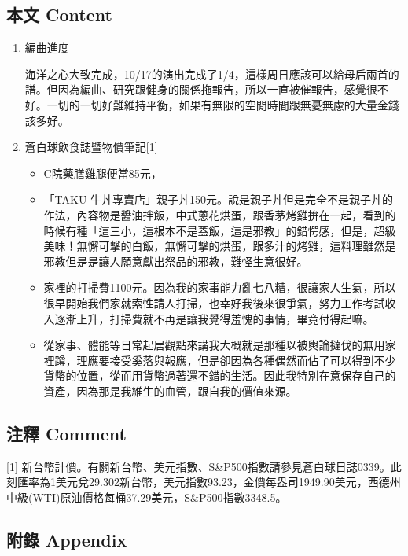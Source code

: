 \documentclass[a5paper, 11pt
]{book}
\providecommand{\tightlist}{%
  \setlength{\itemsep}{0pt}\setlength{\parskip}{0pt}}
\begin{document}
\hypertarget{ux672cux6587-content-10}{%
\subsection{本文 Content}\label{ux672cux6587-content-10}}

\begin{enumerate}
\def\labelenumi{\arabic{enumi}.}
\item
  編曲進度

  海洋之心大致完成，10/17的演出完成了1/4，這樣周日應該可以給母后兩首的譜。但因為編曲、研究跟健身的關係拖報告，所以一直被催報告，感覺很不好。一切的一切好難維持平衡，如果有無限的空閒時間跟無憂無慮的大量金錢該多好。
\item
  蒼白球飲食誌暨物價筆記{[}1{]}

  \begin{itemize}
  \tightlist
  \item
    C院藥膳雞腿便當85元，
  \item
    「TAKU
    牛丼專賣店」親子丼150元。說是親子丼但是完全不是親子丼的作法，內容物是醬油拌飯，中式蔥花烘蛋，跟香茅烤雞拚在一起，看到的時候有種「這三小，這根本不是蓋飯，這是邪教」的錯愕感，但是，超級美味！無懈可擊的白飯，無懈可擊的烘蛋，跟多汁的烤雞，這料理雖然是邪教但是是讓人願意獻出祭品的邪教，難怪生意很好。
  \item
    家裡的打掃費1100元。因為我的家事能力亂七八糟，很讓家人生氣，所以很早開始我們家就索性請人打掃，也幸好我後來很爭氣，努力工作考試收入逐漸上升，打掃費就不再是讓我覺得羞愧的事情，畢竟付得起嘛。
  \item
    從家事、體能等日常起居觀點來講我大概就是那種以被輿論撻伐的無用家裡蹲，理應要接受奚落與報應，但是卻因為各種偶然而佔了可以得到不少貨幣的位置，從而用貨幣過著還不錯的生活。因此我特別在意保存自己的資產，因為那是我維生的血管，跟自我的價值來源。
  \end{itemize}
\end{enumerate}

\hypertarget{ux6ce8ux91cb-comment-10}{%
\subsection{注釋 Comment}\label{ux6ce8ux91cb-comment-10}}

{[}1{]}
新台幣計價。有關新台幣、美元指數、S\&P500指數請參見蒼白球日誌0339。此刻匯率為1美元兌29.302新台幣，美元指數93.23，金價每盎司1949.90美元，西德州中級(WTI)原油價格每桶37.29美元，S\&P500指數3348.5。

\hypertarget{ux9644ux9304-appendix-10}{%
\subsection{附錄 Appendix}\label{ux9644ux9304-appendix-10}}
\end{document}
